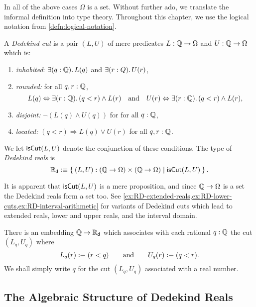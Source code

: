 In all of the above cases $\Omega$ is a set.
%
Without further ado, we translate the informal definition into type theory.
Throughout this chapter, we use the
logical notation from \autoref{defn:logical-notation}.

\begin{defn} \label{defn:dedekind-reals}
  A \emph{Dedekind cut} is a pair $(L, U)$ of mere predicates $L : \mathbb{Q} \to \Omega$ and $U
  : \mathbb{Q} \to \Omega$ which is:
  \begin{enumerate}
  \item \emph{inhabited}: $\exis{q : \Q} L(q)$ and $\exis{r : Q} U(r)$,
  \item \emph{rounded:} for all $q, r : \mathbb{Q}$,
    \begin{equation*}
      L(q) \Leftrightarrow \exis{r : \Q} (q < r) \land L(r)
      \quad\text{and}\quad
      U(r) \Leftrightarrow \exis{r : \Q} (q < r) \land L(r),
    \end{equation*}
  \item \emph{disjoint:} $\lnot (L(q) \land U(q))$ for for all $q : \mathbb{Q}$,
  \item \emph{located:} $(q < r) \Rightarrow L(q) \lor U(r)$ for all $q, r : \mathbb{Q}$.
  \end{enumerate}
  We let $\mathsf{isCut}(L, U)$ denote the conjunction of these conditions. The type of
  \emph{Dedekind reals} is
  \begin{equation*}
    \RD \defeq \setof{ (L, U) : (\Q \to \Omega) \times (\Q \to \Omega) | \dcut(L,U)}.
  \end{equation*}
\end{defn}

It is apparent that $\mathsf{isCut}(L, U)$ is a mere proposition, and since $\mathbb{Q} \to \Omega$ is a
set the Dedekind reals form a set too. See
\autoref{ex:RD-extended-reals,ex:RD-lower-cuts,ex:RD-interval-arithmetic} for variants of
Dedekind cuts which lead to extended reals, lower and upper reals, and the interval
domain.

There is an embedding $\mathbb{Q} \to \mathbb{R}_\mathsf{d}$ which associates with each rational $q : \mathbb{Q}$ the cut
$(L_q, U_q)$ where
%
\begin{equation*}
  L_q(r) \vcentcolon\equiv (r < q)
  \qquad\text{and}\qquad
  U_q(r) \vcentcolon\equiv (q < r).
\end{equation*}
%
We shall simply write $q$ for the cut $(L_q, U_q)$ associated with a real number.

\subsection{The Algebraic Structure of Dedekind Reals}
\label{sec:algebr-struct-dedek}

